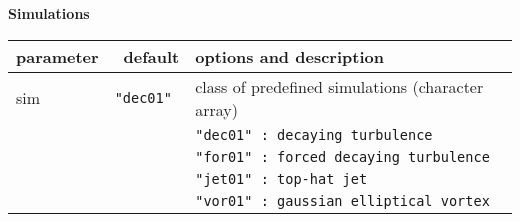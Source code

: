 {\bf Simulations} \\
\noindent
\begin{tabular}{|l|r|l|}
 \hline
 parameter & default & options and description \\
 \hline
 sim          &  \tt{"dec01"} & class of predefined simulations (character array) \\
              &                & \tt{"dec01"} : decaying turbulence \\
              &                & \tt{"for01"} : forced decaying turbulence \\
              &                & \tt{"jet01"} : top-hat jet \\
              &                & \tt{"vor01"} : gaussian elliptical vortex \\
 \hline
\end{tabular}
